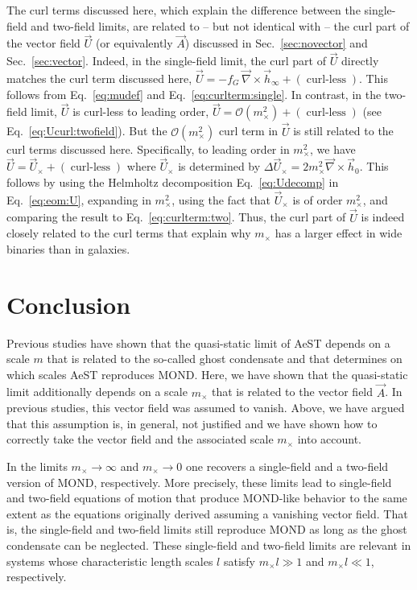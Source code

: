 \documentclass[reprint, amsmath,amssymb, nofootinbib, aps, prd]{revtex4-2}
\begin{document}
The curl terms discussed here, which explain the difference between the single-field and two-field limits, are related to -- but not identical with -- the curl part of the vector field $\vec{U}$ (or equivalently $\vec{A}$) discussed in Sec.~\ref{sec:novector} and Sec.~\ref{sec:vector}.
Indeed, in the single-field limit, the curl part of $\vec{U}$ directly matches the curl term discussed here, $\vec{U} = - f_G \, \vec{\nabla} \times \vec{h}_\infty + (\operatorname{curl-less})$.
This follows from Eq.~\eqref{eq:mudef} and Eq.~\eqref{eq:curlterm:single}.
In contrast, in the two-field limit, $\vec{U}$ is curl-less to leading order, $\vec{U} = \mathcal{O}(m_\times^2) + (\operatorname{curl-less})$ (see Eq.~\eqref{eq:Ucurl:twofield}).
But the $\mathcal{O}(m_\times^2)$ curl term in $\vec{U}$ is still related to the curl terms discussed here.
Specifically, to leading order in $m_\times^2$, we have $\vec{U} = \vec{U}_\times + (\operatorname{curl-less})$ where $\vec{U}_\times$ is determined by $\Delta \vec{U}_\times = 2 m_\times^2 \vec{\nabla} \times \vec{h}_0$.
This follows by using the Helmholtz decomposition Eq.~\eqref{eq:Udecomp} in Eq.~\eqref{eq:eom:U}, expanding in $m_\times^2$, using the fact that $\vec{U}_\times$ is of order $m_\times^2$, and comparing the result to Eq.~\eqref{eq:curlterm:two}.
Thus, the curl part of $\vec{U}$ is indeed closely related to the curl terms that explain why $m_\times$ has a larger effect in wide binaries than in galaxies.

\section{Conclusion}
\label{sec:conclusion}

Previous studies have shown that the quasi-static limit of AeST depends on a scale $m$ that is related to the so-called ghost condensate and that determines on which scales AeST reproduces MOND.
Here, we have shown that the quasi-static limit additionally depends on a scale $m_\times$ that is related to the vector field $\vec{A}$.
In previous studies, this vector field was assumed to vanish.
Above, we have argued that this assumption is, in general, not justified and we have shown how to correctly take the vector field and the associated scale $m_\times$ into account.

In the limits $m_\times \to \infty$ and $m_\times \to 0$ one recovers a single-field and a two-field version of MOND, respectively.
More precisely, these limits lead to single-field and two-field equations of motion that produce MOND-like behavior to the same extent as the equations originally derived assuming a vanishing vector field.
That is, the single-field and two-field limits still reproduce MOND as long as the ghost condensate can be neglected.
These single-field and two-field limits are relevant in systems whose characteristic length scales $l$ satisfy $m_\times l \gg 1$ and $m_\times l \ll 1$, respectively.
\end{document}
